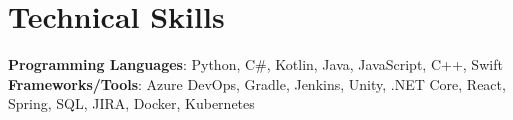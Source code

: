\section{Technical Skills}
 \begin{itemize}[leftmargin=0.15in, label={}]
    \small{\item{
      \textbf{Programming Languages}{: Python, C\#, Kotlin, Java, JavaScript, C++, Swift } \\
     \textbf{Frameworks/Tools}{: Azure DevOps, Gradle, Jenkins, Unity, .NET Core, React, Spring, SQL, JIRA, Docker, Kubernetes }\\
    }}
 \end{itemize}